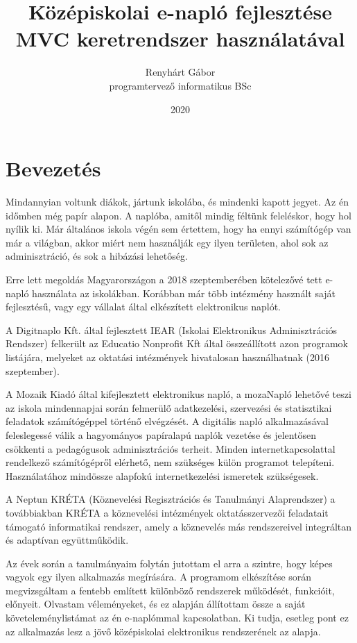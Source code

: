 \documentclass[
]{thesis-ekf}
\begin{document}
\title{Középiskolai e-napló fejlesztése MVC keretrendszer használatával}
\author{Renyhárt Gábor\\programtervező informatikus BSc}
\date{2020}
\maketitle

\tableofcontents

\chapter*{Bevezetés}
Mindannyian voltunk diákok, jártunk iskolába, és mindenki kapott jegyet. Az én időmben még papír alapon. A naplóba, amitől mindig féltünk feleléskor, hogy hol nyílik ki. Már általános iskola végén sem értettem, hogy ha ennyi számítógép van már a világban, akkor miért nem használják egy ilyen területen, ahol sok az adminisztráció, és sok a hibázási lehetőség.

Erre lett megoldás Magyarországon a 2018 szeptemberében kötelezővé tett e-napló használata az iskolákban. Korábban már több intézmény használt saját fejlesztésű, vagy egy vállalat által elkészített elektronikus naplót.

A Digitnaplo Kft. által fejlesztett IEAR (Iskolai Elektronikus Adminisztrációs Rendszer) felkerült az Educatio Nonprofit Kft által összeállított azon programok listájára, melyeket az oktatási intézmények hivatalosan használhatnak (2016 szeptember).

A Mozaik Kiadó által kifejlesztett elektronikus napló, a mozaNapló lehetővé teszi az iskola mindennapjai során felmerülő adatkezelési, szervezési és statisztikai feladatok számítógéppel történő elvégzését. A digitális napló alkalmazásával feleslegessé válik a hagyományos papíralapú naplók vezetése és jelentősen csökkenti a pedagógusok adminisztrációs terheit. Minden internetkapcsolattal rendelkező számítógépről elérhető, nem szükséges külön programot telepíteni. Használatához mindössze alapfokú internetkezelési ismeretek szükségesek.

A Neptun KRÉTA (Köznevelési Regisztrációs és Tanulmányi Alaprendszer) a továbbiakban KRÉTA a köznevelési intézmények oktatásszervezői feladatait támogató informatikai rendszer, amely a köznevelés más rendszereivel integráltan és adaptívan együttműködik. 

Az évek során a tanulmányaim folytán jutottam el arra a szintre, hogy képes vagyok egy ilyen alkalmazás megírására. A programom elkészítése során megvizsgáltam a fentebb említett különböző rendszerek működését, funkcióit, előnyeit. Olvastam véleményeket, és ez alapján állítottam össze a saját követeleménylistámat az én e-naplómmal kapcsolatban.
Ki tudja, esetleg pont ez az alkalmazás lesz a jövő középiskolai elektronikus rendszerének az alapja.
\end{document}
